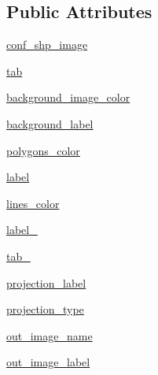 \subsection*{Public Attributes}
\begin{DoxyCompactItemize}
\item 
\hyperlink{classsrc_1_1client_1_1gui_1_1draw__shp__image_1_1Ui__DrawSHPImage_afd4752ae5019d968cc6403b1f1b55923}{conf\_\-shp\_\-image}
\item 
\hyperlink{classsrc_1_1client_1_1gui_1_1draw__shp__image_1_1Ui__DrawSHPImage_a574da3c5a79f480b9c5fed6ab70a8fe9}{tab}
\item 
\hyperlink{classsrc_1_1client_1_1gui_1_1draw__shp__image_1_1Ui__DrawSHPImage_a29880fb5895a29f890b7c528cdbc3e32}{background\_\-image\_\-color}
\item 
\hyperlink{classsrc_1_1client_1_1gui_1_1draw__shp__image_1_1Ui__DrawSHPImage_a73d3f0af279c847fc8b25a6a8f11536f}{background\_\-label}
\item 
\hyperlink{classsrc_1_1client_1_1gui_1_1draw__shp__image_1_1Ui__DrawSHPImage_a92c46e168ce7c8302b8ef420d61ace31}{polygons\_\-color}
\item 
\hyperlink{classsrc_1_1client_1_1gui_1_1draw__shp__image_1_1Ui__DrawSHPImage_a6d43d59d7a87d877a15ca8e9303e176f}{label}
\item 
\hyperlink{classsrc_1_1client_1_1gui_1_1draw__shp__image_1_1Ui__DrawSHPImage_a287526ce238d0ebc2c3bf177e9b00b10}{lines\_\-color}
\item 
\hyperlink{classsrc_1_1client_1_1gui_1_1draw__shp__image_1_1Ui__DrawSHPImage_a65ce68152e536e1c9d86483cb5a62b1e}{label\_}
\item 
\hyperlink{classsrc_1_1client_1_1gui_1_1draw__shp__image_1_1Ui__DrawSHPImage_a5964beac9925892510c4e9d27b3fdb16}{tab\_}
\item 
\hyperlink{classsrc_1_1client_1_1gui_1_1draw__shp__image_1_1Ui__DrawSHPImage_a7ae3d2d8482103d80807c50e94463ba9}{projection\_\-label}
\item 
\hyperlink{classsrc_1_1client_1_1gui_1_1draw__shp__image_1_1Ui__DrawSHPImage_a6bab075f654f9ec7051d4cf0178cae71}{projection\_\-type}
\item 
\hyperlink{classsrc_1_1client_1_1gui_1_1draw__shp__image_1_1Ui__DrawSHPImage_a9c06a3241281059e559b4d00152f0c71}{out\_\-image\_\-name}
\item 
\hyperlink{classsrc_1_1client_1_1gui_1_1draw__shp__image_1_1Ui__DrawSHPImage_a6baeb5c22d05428f2391d39ab15478a7}{out\_\-image\_\-label}
\item 

\end{DoxyCompactItemize}
